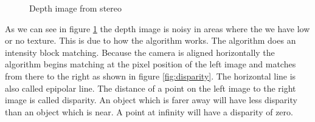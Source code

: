 \documentclass[11pt,a4paper,titlepage,oneside]{report}
\begin{document}
\begin{figure}[H]
	\centering
	\caption{Depth image from stereo}\label{fig:depth}
\end{figure}

As we can see in figure \ref{fig:depth} the depth image is noisy in areas where the we have low or no texture. This is due to how the algorithm works. The algorithm does an intensity block matching. Because the camera is aligned horizontally the algorithm begins matching at the pixel position of the left image and matches from there to the right as shown in figure \ref{fig:disparity}. The horizontal line is also called epipolar line. The distance of a point on the left image to the right image is called disparity. An object which is farer away will have less disparity than an object which is near. A point at infinity will have a disparity of zero.
\end{document}
